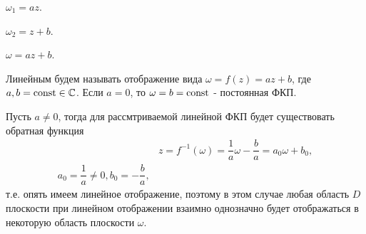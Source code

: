 \begin{plan}
\item $\omega_1 = az$.
\item $\omega_2 = z + b$.
\item $\omega = az + b$.
\end{plan}

\begin{col-answer-preambule}
\end{col-answer-preambule}
Линейным будем называть отображение вида $\omega = f(z) = az + b$, где
$a, b = \operatorname{\text{const}} \in \mathbb{C}$. Если $a = 0$, то $\omega = b = \operatorname{\text{const}}$ - постоянная ФКП.

Пусть $a \neq 0$, тогда для рассмтриваемой линейной ФКП будет существовать обратная функция
\begin{align*}
  &z = f^{-1}(\omega) = \dfrac{1}{a}\omega - \dfrac{b}{a} = a_0\omega + b_0,\\
  a_0 = \dfrac{1}{a}\neq 0, b_0 = -\dfrac{b}{a},
\end{align*}
т.е. опять имеем линейное отображение, поэтому в этом случае любая область $D$ плоскости
 при линейном отображении взаимно однозначно будет отображаться в некоторую область
плоскости $\omega$.

